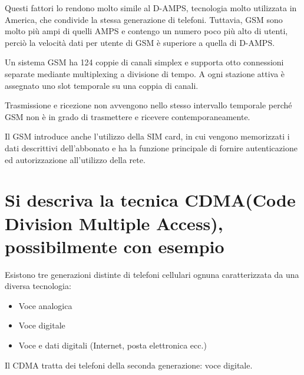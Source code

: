 Questi fattori lo rendono molto simile al D-AMPS, tecnologia molto utilizzata in America, che condivide la stessa generazione di telefoni. Tuttavia, GSM sono molto più ampi di quelli AMPS e contengo un numero poco più alto di utenti, perciò la velocità dati per utente di GSM è superiore a quella di D-AMPS.

Un sistema GSM ha 124 coppie di canali simplex e supporta otto connessioni separate mediante multiplexing a divisione di tempo.
A ogni stazione attiva è assegnato uno slot temporale su una coppia di canali.

Trasmissione e ricezione non avvengono nello stesso intervallo temporale perché GSM non è in grado di trasmettere e ricevere contemporaneamente.

Il GSM introduce anche l’utilizzo della SIM card, in cui vengono memorizzati i dati descrittivi dell’abbonato e ha la funzione principale di fornire autenticazione ed autorizzazione all’utilizzo della rete.

\section{Si descriva la tecnica CDMA(Code Division Multiple Access), possibilmente con esempio}
Esistono tre generazioni distinte di telefoni cellulari ognuna caratterizzata da una diversa tecnologia:
\begin{itemize}
\item	Voce analogica
\item	Voce digitale
\item	Voce e dati digitali (Internet, posta elettronica ecc.)
\end{itemize}
Il CDMA tratta dei telefoni della seconda generazione: voce digitale.

